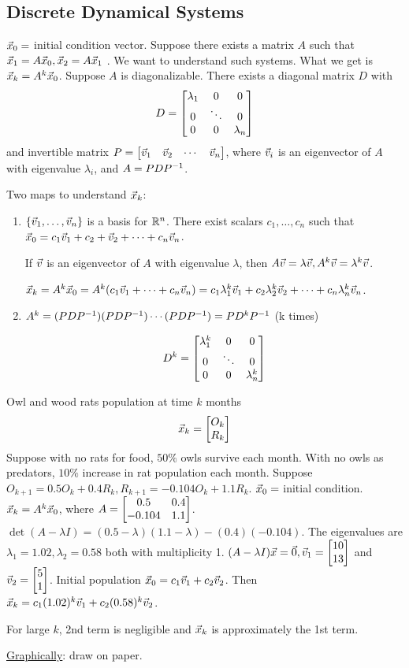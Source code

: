 \documentclass[10pt,a4paper]{article}
\begin{document}
\subsection{Discrete Dynamical Systems}

$\vec{x}_0 = $ initial condition vector.
Suppose there exists a matrix $A$ such that $\vec{x}_1 = A \vec{x}_0, \vec{x}_2 = A\vec{x}_1$%
. We want to understand such systems. What we get is $\vec{x}_k = A^k \vec{x}_0$. Suppose $A$ is diagonalizable. There exists a diagonal matrix $D$ with $$D = \begin{bmatrix}\lambda_1 & 0 & 0 \\ 0 &\ddots & 0 \\ 0 & 0 & \lambda_n\end{bmatrix}$$ and invertible matrix $P = \begin{bmatrix}\vec{v}_1&\vec{v}_2&\cdots&\vec{v}_n\end{bmatrix}$, where $\vec{v}_i$ is an eigenvector of $A$ with eigenvalue $\lambda_i$, and $A = PDP^{-1}$.

Two maps to understand $\vec{x}_k$:
\begin{enumerate}
	\item $\{\vec{v}_1,\dots,\vec{v}_n\}$ is a basis for $\mathbb{R}^n$. There exist scalars $c_1,\dots,c_n$ such that $\vec{x}_0 = c_1 \vec{v}_1 + c_2 + \vec{v}_2 + \cdots + c_n \vec{v}_n$.
	\begin{remark}
		If $\vec{v}$ is an eigenvector of $A$ with eigenvalue $\lambda$, then $A\vec{v} = \lambda \vec{v}, A^k \vec{v} = \lambda^k \vec{v}$.
	\end{remark} 
	$\vec{x}_k = A^k \vec{x}_0 = A^k (c_1 \vec{v}_1 +\cdots + c_n \vec{v}_n) = c_1\lambda_1^k \vec{v}_1 + c_2\lambda_2^k \vec{v}_2 + \cdots + c_n \lambda_n^k \vec{v}_n$.
	\item $A^k = (PDP^{-1})(PDP^{-1})\cdots(PDP^{-1}) = PD^kP^{-1}$ (k times) \begin{note}
		$$D^k = \begin{bmatrix}\lambda_1^k & 0 & 0 \\ 0 &\ddots & 0 \\ 0 & 0 & \lambda_n^k\end{bmatrix}$$
	\end{note}
\end{enumerate}

\begin{example}
	Owl and wood rats population at time $k$ months $$\vec{x}_k = \begin{bmatrix}O_k \\ R_k\end{bmatrix}$$ 
	Suppose with no rats for food, $50\%$ owls survive each month. With no owls as predators, $10\%$ increase in rat population each month. Suppose $O_{k+1} = 0.5 O_k + 0.4 R_k,R_{k+1} = -0.104 O_k + 1.1 R_k$.
	$\vec{x}_0 = $ initial condition. $\vec{x}_k = A^k \vec{x}_0$, where $A = \begin{bmatrix}0.5 & 0.4 \\ -0.104 & 1.1\end{bmatrix}$. $\det(A-\lambda I) = (0.5 - \lambda)(1.1-\lambda) - (0.4)(-0.104)$. The eigenvalues are $\lambda_1=1.02,\lambda_2 = 0.58$ both with multiplicity 1.
	$(A-\lambda I)\vec{x} = \vec{0}, \vec{v}_1=\begin{bmatrix}10\\13\end{bmatrix}$ and $\vec{v}_2 = \begin{bmatrix}5\\1\end{bmatrix}$.
	Initial population $\vec{x}_0 = c_1 \vec{v}_1 + c_2 \vec{v}_2$. Then $\vec{x}_k = c_1 (1.02)^k \vec{v}_1 + c_2 (0.58)^k \vec{v}_2$.
	\begin{note}
		For large $k$, 2nd term is negligible and $\vec{x}_k$ is approximately the 1st term.
	\end{note}
	\underline{Graphically}: draw on paper.
\end{example}
\end{document}
